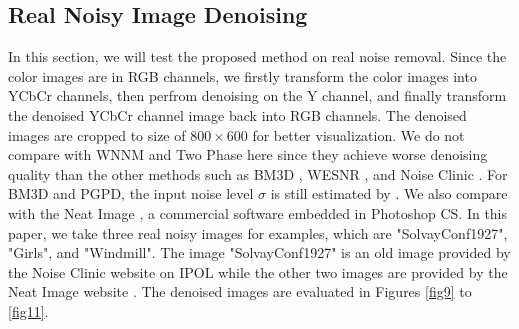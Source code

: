 \documentclass[runningheads]{llncs}
\begin{document}
\subsection{Real Noisy Image Denoising}
\vspace{-0.1in}
In this section, we will test the proposed method on real noise removal. Since the color images are in RGB channels, we firstly transform the color images into YCbCr channels, then perfrom denoising on the Y channel, and finally transform the denoised YCbCr channel image back into RGB channels. The denoised images are cropped to size of $800\times600$ for better visualization. We do not compare with WNNM \cite{wnnm} and Two Phase \cite{cai2010fast} here since they achieve worse denoising quality than the other methods such as BM3D \cite{bm3d}, WESNR \cite{wesnr}, and Noise Clinic \cite{noiseclinic}. For BM3D and PGPD, the input noise level $\sigma$ is still estimated by \cite{liu2013single}. We also compare with the Neat Image \cite{neatimage}, a commercial software embedded in Photoshop CS. In this paper, we take three real noisy images for examples, which are "SolvayConf1927", "Girls", and "Windmill". The image "SolvayConf1927" is an old image provided by the Noise Clinic website on IPOL \cite{ncwebsite} while the other two images are provided by the Neat Image website \cite{neatimage}. The denoised images are evaluated in Figures \ref{fig9} to \ref{fig11}.
\end{document}
